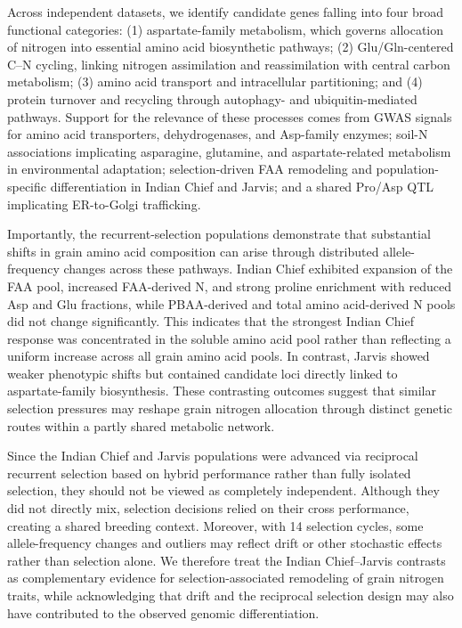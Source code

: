 \quad Across independent datasets, we identify candidate genes falling into four broad functional categories: (1) aspartate-family metabolism, which governs allocation of nitrogen into essential amino acid biosynthetic pathways; (2) Glu/Gln-centered C--N cycling, linking nitrogen assimilation and reassimilation with central carbon metabolism; (3) amino acid transport and intracellular partitioning; and (4) protein turnover and recycling through autophagy- and ubiquitin-mediated pathways. Support for the relevance of these processes comes from GWAS signals for amino acid transporters, dehydrogenases, and Asp-family enzymes; soil-N associations implicating asparagine, glutamine, and aspartate-related metabolism in environmental adaptation; selection-driven FAA remodeling and population-specific differentiation in Indian Chief and Jarvis; and a shared Pro/Asp QTL implicating ER-to-Golgi trafficking.

\quad Importantly, the recurrent-selection populations demonstrate that substantial shifts in grain amino acid composition can arise through distributed allele-frequency changes across these pathways. Indian Chief exhibited expansion of the FAA pool, increased FAA-derived N, and strong proline enrichment with reduced Asp and Glu fractions, while PBAA-derived and total amino acid-derived N pools did not change significantly. This indicates that the strongest Indian Chief response was concentrated in the soluble amino acid pool rather than reflecting a uniform increase across all grain amino acid pools. In contrast, Jarvis showed weaker phenotypic shifts but contained candidate loci directly linked to aspartate-family biosynthesis. These contrasting outcomes suggest that similar selection pressures may reshape grain nitrogen allocation through distinct genetic routes within a partly shared metabolic network.

Since the Indian Chief and Jarvis populations were advanced via reciprocal recurrent selection based on hybrid performance rather than fully isolated selection, they should not be viewed as completely independent. Although they did not directly mix, selection decisions relied on their cross performance, creating a shared breeding context. Moreover, with 14 selection cycles, some allele-frequency changes and outliers may reflect drift or other stochastic effects rather than selection alone. We therefore treat the Indian Chief–Jarvis contrasts as complementary evidence for selection-associated remodeling of grain nitrogen traits, while acknowledging that drift and the reciprocal selection design may also have contributed to the observed genomic differentiation.

